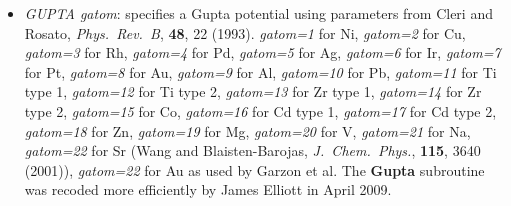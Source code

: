 \documentclass[12pt,a4paper,dvips]{article}
\begin{document}
\begin{itemize}
\item{\it GUPTA gatom}: specifies a Gupta potential using parameters from Cleri and Rosato,
{\it Phys.~Rev.~B}, {\bf 48}, 22 (1993). {\it gatom=1} for Ni, 
{\it gatom=2} for Cu,
{\it gatom=3} for Rh,
{\it gatom=4} for Pd,
{\it gatom=5} for Ag,
{\it gatom=6} for Ir,
{\it gatom=7} for Pt,
{\it gatom=8} for Au,
{\it gatom=9} for Al,
{\it gatom=10} for Pb,
{\it gatom=11} for Ti type 1,
{\it gatom=12} for Ti type 2,
{\it gatom=13} for Zr type 1,
{\it gatom=14} for Zr type 2,
{\it gatom=15} for Co,
{\it gatom=16} for Cd type 1,
{\it gatom=17} for Cd type 2,
{\it gatom=18} for Zn,
{\it gatom=19} for Mg,
{\it gatom=20} for V,
{\it gatom=21} for Na,
{\it gatom=22} for Sr (Wang  and Blaisten-Barojas, {\it J.~Chem.~Phys.}, {\bf 115}, 3640 (2001)),
{\it gatom=22} for Au as used by Garzon et al.
The {\bf Gupta} subroutine was recoded more efficiently by James Elliott in April 2009.




\end{itemize}
\end{document}
